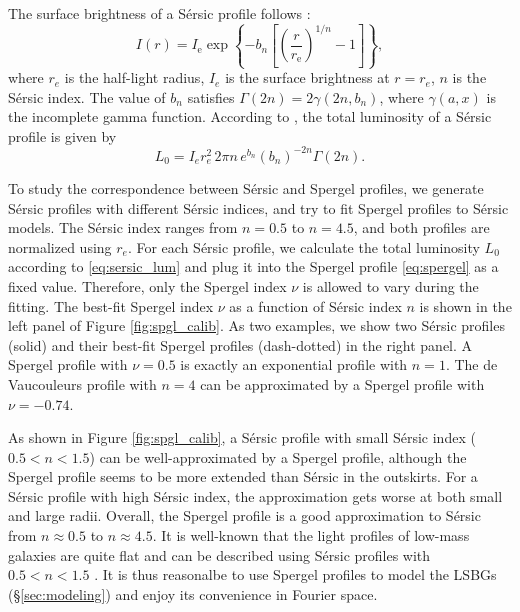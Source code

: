 \documentclass[twocolumn,astrosymb,twocolappendix]{aastex631}
\newcommand{\sersic}{S\'ersic}
\begin{document}
\begin{CJK*}{UTF8}{gbsn}
The surface brightness of a \sersic{} profile follows \citep{Sersic1963,Graham2005}:
\begin{equation}\label{eq:sersic}
    I(r)=I_{\mathrm{e}} \exp \left\{-b_{n}\left[\left(\frac{r}{r_{\mathrm{e}}}\right)^{1 / n}-1\right]\right\},
\end{equation}
where $r_e$ is the half-light radius, $I_e$ is the surface brightness at $r=r_e$, $n$ is the \sersic{} index. The value of $b_n$ satisfies $\Gamma(2 n)=2 \gamma\left(2 n, b_{n}\right)$, where $\gamma(a, x)$ is the incomplete gamma function. According to \citet{Graham2005}, the total luminosity of a \sersic{} profile is given by 
\begin{equation}\label{eq:sersic_lum}
    L_0 = I_{e} r_{e}^{2}\, 2 \pi n\, e^{b_{n}} \left(b_{n}\right)^{-2 n} \Gamma(2 n).
\end{equation}

To study the correspondence between \sersic{} and Spergel profiles, we generate \sersic{} profiles with different \sersic{} indices, and try to fit Spergel profiles to \sersic{} models. The \sersic{} index ranges from $n=0.5$ to $n=4.5$, and both profiles are normalized using $r_e$. For each \sersic{} profile, we calculate the total luminosity $L_0$ according to \eqref{eq:sersic_lum} and plug it into the Spergel profile \eqref{eq:spergel} as a fixed value. Therefore, only the Spergel index $\nu$ is allowed to vary during the fitting. The best-fit Spergel index $\nu$ as a function of \sersic{} index $n$ is shown in the left panel of Figure \ref{fig:spgl_calib}. As two examples, we show two \sersic{} profiles (solid) and their best-fit Spergel profiles (dash-dotted) in the right panel. A Spergel profile with $\nu=0.5$ is exactly an exponential profile with $n=1$. The de Vaucouleurs profile \citep{deVaucouleurs1948} with $n=4$ can be approximated by a Spergel profile with $\nu=-0.74$. 

As shown in Figure \ref{fig:spgl_calib}, a \sersic{} profile with small \sersic{} index ($0.5 < n < 1.5$) can be well-approximated by a Spergel profile, although the Spergel profile seems to be more extended than \sersic{} in the outskirts. For a \sersic{} profile with high \sersic{} index, the approximation gets worse at both small and large radii. Overall, the Spergel profile is a good approximation to \sersic{} from $n\approx 0.5$ to $n\approx 4.5$. It is well-known that the light profiles of low-mass galaxies are quite flat and can be described using \sersic{} profiles with $0.5 < n < 1.5$ \citep[e.g.,][]{vanDokkum2015,Lange2015,Greco2018,Zaritsky2021,ELVES-I}. It is thus reasonalbe to use Spergel profiles to model the LSBGs (\S\ref{sec:modeling}) and enjoy its convenience in Fourier space. 


\end{CJK*}
\end{document}
